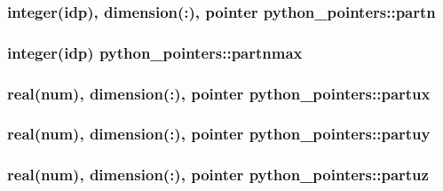 \subsubsection[{\texorpdfstring{partn}{partn}}]{\setlength{\rightskip}{0pt plus 5cm}integer(idp), dimension(\+:), pointer python\+\_\+pointers\+::partn}\hypertarget{namespacepython__pointers_a409a7bbbe4a92197cff88731aeb97fba}{}\label{namespacepython__pointers_a409a7bbbe4a92197cff88731aeb97fba}
\subsubsection[{\texorpdfstring{partnmax}{partnmax}}]{\setlength{\rightskip}{0pt plus 5cm}integer(idp) python\+\_\+pointers\+::partnmax}\hypertarget{namespacepython__pointers_a9e83842bc27e9a1d4021ea9c0ddd0320}{}\label{namespacepython__pointers_a9e83842bc27e9a1d4021ea9c0ddd0320}
\subsubsection[{\texorpdfstring{partux}{partux}}]{\setlength{\rightskip}{0pt plus 5cm}real(num), dimension(\+:), pointer python\+\_\+pointers\+::partux}\hypertarget{namespacepython__pointers_a733cff77ba19e5a06a73224fe9f53542}{}\label{namespacepython__pointers_a733cff77ba19e5a06a73224fe9f53542}
\subsubsection[{\texorpdfstring{partuy}{partuy}}]{\setlength{\rightskip}{0pt plus 5cm}real(num), dimension(\+:), pointer python\+\_\+pointers\+::partuy}\hypertarget{namespacepython__pointers_a60b173a25b047377d55cd66dfb5fad04}{}\label{namespacepython__pointers_a60b173a25b047377d55cd66dfb5fad04}
\subsubsection[{\texorpdfstring{partuz}{partuz}}]{\setlength{\rightskip}{0pt plus 5cm}real(num), dimension(\+:), pointer python\+\_\+pointers\+::partuz}\hypertarget{namespacepython__pointers_a98c8cf1649933f3239b068104d637d6c}{}\label{namespacepython__pointers_a98c8cf1649933f3239b068104d637d6c}
